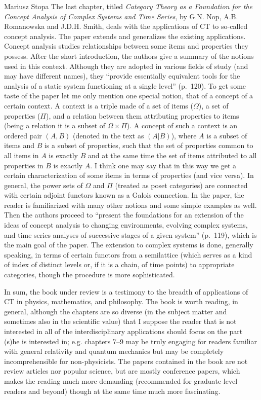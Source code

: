 \begin{recengenv}{Mariusz Stopa}
\enlargethispage{-.5\baselineskip}
The last chapter, titled \textit{Category Theory as a Foundation for the Concept Analysis of Complex Systems and Time Series}, by G.N. Nop, A.B. Romanowska and J.D.H. Smith, deals with the applications of CT to so-called concept analysis. The paper extends and generalizes the existing applications. Concept analysis studies relationships between some items and properties they possess. After the short introduction, the authors give a summary of the notions used in this context. Although they are adopted in various fields of study (and may have different names), they ``provide essentially equivalent tools for the analysis of a static system functioning at a single level'' (p.~120). To get some taste of the paper let me only mention one special notion, that of a concept of a certain context. A context is a triple made of a set of items ($ \Omega $), a set of properties ($ \Pi $), and a relation between them attributing properties to items (being a relation it is a subset of $ \Omega\times\Pi $). A concept of such a context is an ordered pair $ (A, B) $ (denoted in the text as $ (A|B) $), where $ A $ is a subset of items and $ B $ is a subset of properties, such that the set of properties common to all items in $ A $ is exactly $ B $ and at the same time the set of items attributed to all properties in $ B $ is exactly $ A $. I think one may say that in this way we get a certain characterization of some items in terms of properties (and vice versa). In general, the power sets of $ \Omega $ and $ \Pi $ (treated as poset cat\-e\-gories) are connected with certain adjoint functors known as a Galois connection. In the paper, the reader is familiarized with many other notions and some simple examples as well. Then the authors proceed to ``present the foundations for an extension of the ideas of concept analysis to changing environments, evolving complex systems, and time series analyses of successive stages of a given system'' (p.~119), which is the main goal of the paper. The extension to complex systems is done, generally speaking, in terms of certain functors from a semilattice (which serves as a kind of index of distinct levels or, if it is a chain, of time points) to appropriate cat\-e\-gories, though the procedure is more sophisticated.

In sum, the book under review is a testimony to the breadth of applications of CT in physics, mathematics, and philosophy. The book is worth reading, in general, although the chapters are so diverse (in the subject matter and sometimes also in the scientific value) that I suppose the reader that is not interested in all of the interdisciplinary applications should focus on the part (s)he is interested in; e.g. chapters 7--9 may be truly engaging for readers familiar with general relativity and quantum mechanics but may be completely incomprehensible for non-physicists. The papers contained in the book are not review articles nor popular science, but are mostly conference papers, which makes the reading much more demanding (recommended for graduate-level readers and beyond) though at the same time much more fascinating.


\end{recengenv}
